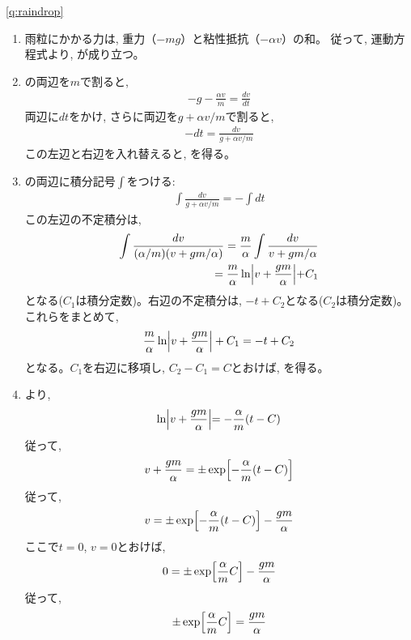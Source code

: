 \ref{q:raindrop}
\begin{enumerate}
\item 雨粒にかかる力は, 重力（$-mg$）と粘性抵抗（$-\alpha v$）の和。
従って, 運動方程式より, が成り立つ。
\item {}の両辺を$m$で割ると, 
\begin{eqnarray}-g-\frac{\alpha v}{m}=\frac{dv}{dt}\end{eqnarray}
両辺に$dt$をかけ, さらに両辺を$g+\alpha v/m$で割ると, 
\begin{eqnarray}-dt=\frac{dv}{g+\alpha v/m}\end{eqnarray}
この左辺と右辺を入れ替えると, を得る。
\item {}の両辺に積分記号$\int$をつける:
\begin{eqnarray}\int\frac{dv}{g+\alpha v/m}=-\int dt\end{eqnarray}
この左辺の不定積分は, 
\begin{eqnarray*}
\int\frac{dv}{(\alpha/m)(v+gm/\alpha)}=\frac{m}{\alpha}\int\frac{dv}{v+gm/\alpha}\\
=\frac{m}{\alpha}\ln\Bigr|v+\frac{gm}{\alpha}\Bigl|+C_1
\end{eqnarray*}
となる($C_1$は積分定数)。右辺の不定積分は, $-t+C_2$となる($C_2$は積分定数)。これらをまとめて, 
\begin{eqnarray}
\frac{m}{\alpha}\ln\Bigl|v+\frac{gm}{\alpha}\Bigr|+C_1=-t+C_2
\end{eqnarray}
となる。$C_1$を右辺に移項し, $C_2-C_1=C$とおけば, を得る。
\item {}より, 
\begin{eqnarray}
\ln\Bigr|v+\frac{gm}{\alpha}\Bigl|=-\frac{\alpha}{m}(t-C)
\end{eqnarray}
従って, 
\begin{eqnarray}
v+\frac{gm}{\alpha}=\pm\exp\Bigl[-\frac{\alpha}{m}(t-C)\Bigr]
\end{eqnarray}
従って, 
\begin{eqnarray}
v=\pm\exp\Bigl[-\frac{\alpha}{m}(t-C)\Bigr]-\frac{gm}{\alpha}\label{eq:randrop_ans11}
\end{eqnarray}
ここで$t=0$, $v=0$とおけば, 
\begin{eqnarray}
0=\pm\exp\Bigl[\frac{\alpha}{m}C\Bigr]-\frac{gm}{\alpha}
\end{eqnarray}
従って, 
\begin{eqnarray}
\pm\exp\Bigl[\frac{\alpha}{m}C\Bigr]=\frac{gm}{\alpha}

\end{eqnarray}
\end{enumerate}

